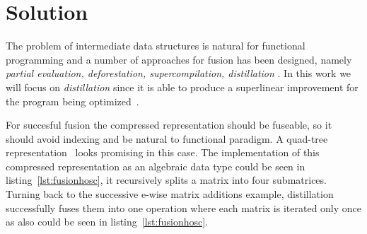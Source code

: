 \documentclass[acmsmall,review,nonacm]{acmart}\settopmatter{printfolios=true,printccs=false,printacmref=false}
\begin{document}

\section{Solution}

The problem of intermediate data structures is natural for functional programming and
a number of approaches for fusion has been designed, namely \emph{partial evaluation, deforestation, supercompilation, distillation} \cite{jones, WADLER1990231, supercompilation, distillation}. In this work we will focus on \emph{distillation} since it is able to produce a superlinear improvement for the program being optimized~\cite{distillation}.

For succesful fusion the compressed representation should be fuseable, so it should avoid indexing and be natural to functional paradigm. A quad-tree representation~\cite{qtree} looks promising in this case. The implementation of this compressed representation as an algebraic data type could be seen in listing~\ref{lst:fusionhosc}, it recursively splits a matrix into four submatrices. Turning back to the successive e-wise matrix additions example, distillation successfully fuses them into one operation where each matrix is iterated only once as also could be seen in listing~\ref{lst:fusionhosc}. 
\end{document}
